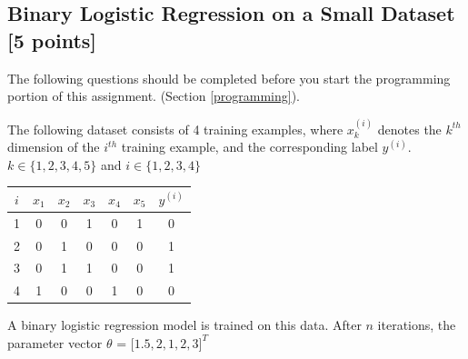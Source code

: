 \documentclass[11pt]{article}
\numberwithin{equation}{section} %
\numberwithin{figure}{section} %
\numberwithin{table}{section} %
\begin{document}
 \subsection{Binary Logistic Regression on a Small Dataset [5 points]}
 \label{sec:warm-up}
 The following questions should be completed before you start the programming portion of this assignment. (Section \ref{programming}).
 
 The following dataset consists of 4 training examples, where $x_k^{(i)}$ denotes the $k^{th}$ dimension of the $i^{th}$ training example, and the corresponding label $y^{(i)}$. $k \in \{1, 2, 3, 4, 5\}$ and $i \in \{1, 2, 3, 4\}$

\begin{center}
\begin{tabular}{|c|c|c|c|c|c|c|}
\hline
$i$ & $x_{1}$ & $x_{2}$ & $x_{3}$ & $x_{4}$ & $x_{5}$ & $y^{(i)}$ \\ \hline
1 & 0 & 0 & 1 & 0 & 1 & 0   \\ \hline
2 & 0 & 1 & 0 & 0 & 0 & 1     \\ \hline
3 & 0 & 1 & 1 & 0 & 0 & 1    \\ \hline
4 & 1 & 0 & 0 & 1 & 0 & 0   \\ \hline

\end{tabular}
\end{center}

A binary logistic regression model is trained on this data. After $n$ iterations, the parameter vector $\theta$ = $\lbrack 1.5, 2, 1, 2, 3 \rbrack^T$
\end{document}
